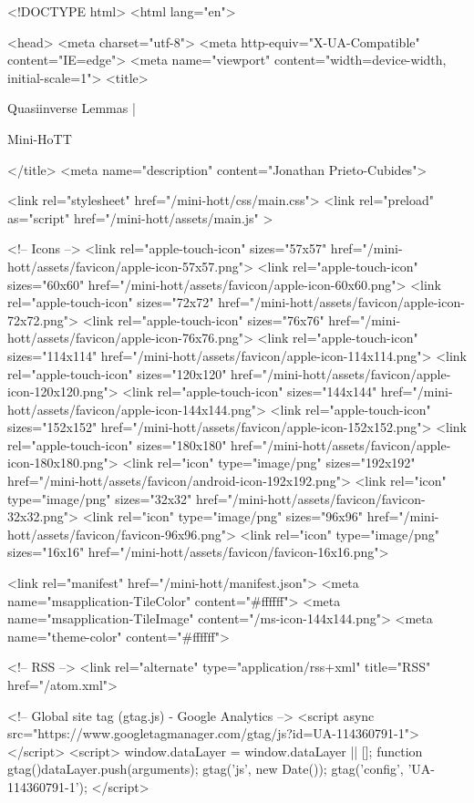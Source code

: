 <!DOCTYPE html>
<html lang="en">

<head>
  <meta charset="utf-8">
  <meta http-equiv="X-UA-Compatible" content="IE=edge">
  <meta name="viewport" content="width=device-width, initial-scale=1">
  <title>
    
      
        Quasiinverse Lemmas |
      
        Mini-HoTT
    
  </title>
  <meta name="description" content="Jonathan Prieto-Cubides">

  <link rel="stylesheet" href="/mini-hott/css/main.css">
  <link rel="preload" as="script" href="/mini-hott/assets/main.js" >

  <!-- Icons -->
  <link rel="apple-touch-icon" sizes="57x57" href="/mini-hott/assets/favicon/apple-icon-57x57.png">
  <link rel="apple-touch-icon" sizes="60x60" href="/mini-hott/assets/favicon/apple-icon-60x60.png">
  <link rel="apple-touch-icon" sizes="72x72" href="/mini-hott/assets/favicon/apple-icon-72x72.png">
  <link rel="apple-touch-icon" sizes="76x76" href="/mini-hott/assets/favicon/apple-icon-76x76.png">
  <link rel="apple-touch-icon" sizes="114x114" href="/mini-hott/assets/favicon/apple-icon-114x114.png">
  <link rel="apple-touch-icon" sizes="120x120" href="/mini-hott/assets/favicon/apple-icon-120x120.png">
  <link rel="apple-touch-icon" sizes="144x144" href="/mini-hott/assets/favicon/apple-icon-144x144.png">
  <link rel="apple-touch-icon" sizes="152x152" href="/mini-hott/assets/favicon/apple-icon-152x152.png">
  <link rel="apple-touch-icon" sizes="180x180" href="/mini-hott/assets/favicon/apple-icon-180x180.png">
  <link rel="icon" type="image/png" sizes="192x192"  href="/mini-hott/assets/favicon/android-icon-192x192.png">
  <link rel="icon" type="image/png" sizes="32x32" href="/mini-hott/assets/favicon/favicon-32x32.png">
  <link rel="icon" type="image/png" sizes="96x96" href="/mini-hott/assets/favicon/favicon-96x96.png">
  <link rel="icon" type="image/png" sizes="16x16" href="/mini-hott/assets/favicon/favicon-16x16.png">

  <link rel="manifest" href="/mini-hott/manifest.json">
  <meta name="msapplication-TileColor" content="#ffffff">
  <meta name="msapplication-TileImage" content="/ms-icon-144x144.png">
  <meta name="theme-color" content="#ffffff">

  <!-- RSS -->
  <link rel="alternate" type="application/rss+xml" title="RSS" href="/atom.xml">

  <!-- Global site tag (gtag.js) - Google Analytics -->
  <script async src="https://www.googletagmanager.com/gtag/js?id=UA-114360791-1"></script>
  <script>
    window.dataLayer = window.dataLayer || [];
    function gtag(){dataLayer.push(arguments);}
    gtag('js', new Date());
    gtag('config', 'UA-114360791-1');
  </script>

